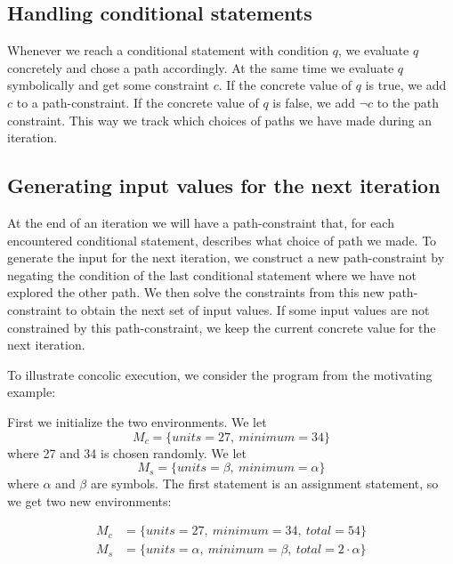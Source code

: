 	\subsection{Handling conditional statements}
	
	Whenever we reach a conditional statement with condition $q$, we evaluate $q$ concretely and chose a path accordingly. At the same time we evaluate $q$ symbolically and get some constraint $c$. If the concrete value of $q$ is true, we add $c$ to a path-constraint. If the concrete value of $q$ is false, we add $\neg c$ to the path constraint. This way we track which choices of paths we have made during an iteration. 
	
	\subsection{Generating input values for the next iteration}
	
	At the end of an iteration we will have a path-constraint that, for each encountered conditional statement, describes what choice of path we made. To generate the input for the next iteration, we construct a new path-constraint by negating the condition of the last conditional statement where we have not explored the other path. We then solve the constraints from this new path-constraint to obtain the next set of input values. If some input values are not constrained by this path-constraint, we keep the current concrete value for the next iteration. 

\bigskip
To illustrate concolic execution, we consider the program from the motivating example:
\motexample

\noindent First we initialize the two environments. We let 
\begin{equation*}
	M_c = \{units = 27, \ minimum = 34\}
\end{equation*}
 where 27 and 34 is chosen randomly. We let
\begin{equation*}
 	M_s = \{units =\beta, \ minimum = \alpha\}
\end{equation*}
where $\alpha$ and $\beta$ are symbols. The first statement is an assignment statement, so we get two new environments:

\begin{align*}
	M_c & = \{units = 27, \ minimum = 34, \ total = 54 \}\\
	M_s & = \{units = \alpha, \ minimum = \beta, \ total = 2\cdot \alpha \}
\end{align*}

